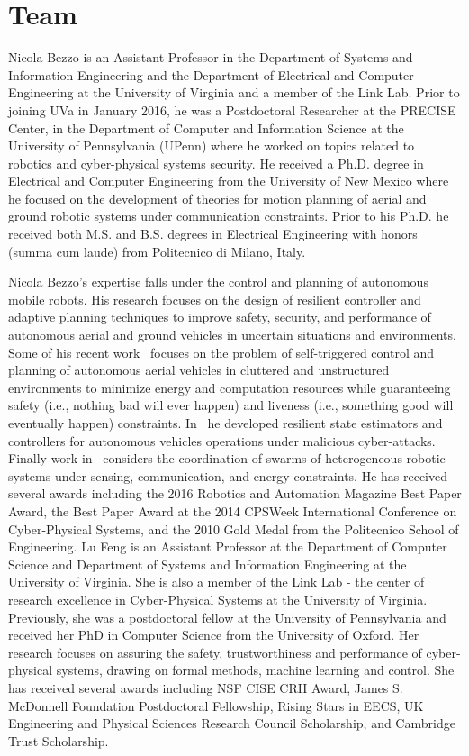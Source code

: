 

\section{Team}
\label{sec:team}
Nicola Bezzo is an Assistant Professor in the Department of Systems and Information Engineering and the Department of Electrical and Computer Engineering at the University of Virginia and a member of the Link Lab. Prior to joining UVa in January 2016, he was a Postdoctoral Researcher at the PRECISE Center, in the Department of Computer and Information Science at the University of Pennsylvania (UPenn) where he worked on topics related to robotics and cyber-physical systems security. He received a Ph.D. degree in Electrical and Computer Engineering from the University of New Mexico where he focused on the development of theories for motion planning of aerial and ground robotic systems under communication constraints. Prior to his Ph.D. he received both M.S. and B.S. degrees in Electrical Engineering with honors (summa cum laude) from Politecnico di Milano, Italy.

Nicola Bezzo's expertise falls under the control and planning of autonomous mobile robots. His research focuses on the design of resilient controller and adaptive planning techniques to improve safety, security, and performance of autonomous aerial and ground vehicles in uncertain situations and environments.  Some of his recent work~\cite{bezzo2016uav,yel2017replanning} focuses on the problem of self-triggered control and planning of autonomous aerial vehicles in cluttered and unstructured environments to minimize energy and computation resources while guaranteeing safety (i.e., nothing bad will ever happen) and liveness (i.e., something good will eventually happen) constraints. In~\cite{bezzo2016stochastic,bezzo2014attack,elnaggar2017safe} he developed resilient state estimators and controllers for autonomous vehicles operations under malicious cyber-attacks. Finally work in~\cite{bezzo2014mech,bezzo2012router,bezzo2011routerswarm} considers the coordination of swarms of heterogeneous robotic systems under sensing, communication, and energy constraints. He has received several awards including the 2016 Robotics and Automation Magazine Best Paper Award, the Best Paper Award at the 2014 CPSWeek International Conference on Cyber-Physical Systems, and the 2010 Gold Medal from the Politecnico School of Engineering.
Lu Feng is an Assistant Professor at the Department of Computer Science and Department of Systems and Information Engineering at the University of Virginia. She is also a member of the Link Lab - the center of research excellence in Cyber-Physical Systems at the University of Virginia. Previously, she was a postdoctoral fellow at the University of Pennsylvania and received her PhD in Computer Science from the University of Oxford. Her research focuses on assuring the safety, trustworthiness and performance of cyber-physical systems, drawing on formal methods, machine learning and control. She has received several awards including NSF CISE CRII Award, James S. McDonnell Foundation Postdoctoral Fellowship, Rising Stars in EECS, UK Engineering and Physical Sciences Research Council Scholarship, and Cambridge Trust Scholarship.

